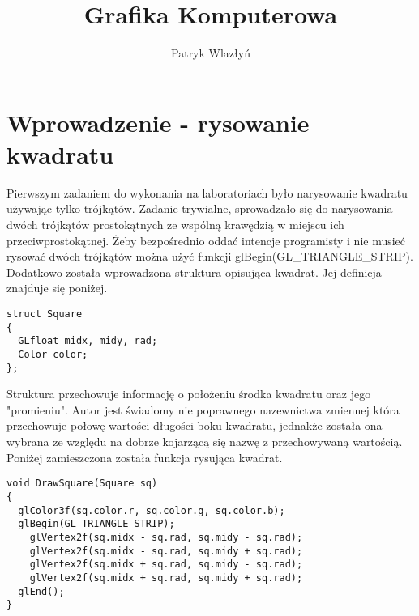 \documentclass{article}
\title{Grafika Komputerowa}
\author{Patryk Wlazłyń}
\begin{document}
\maketitle

\section{Wprowadzenie - rysowanie kwadratu}
\justify
Pierwszym zadaniem do wykonania na laboratoriach było narysowanie kwadratu używając tylko trójkątów.
Zadanie trywialne, sprowadzało się do narysowania dwóch trójkątów prostokątnych ze wspólną krawędzią w miejscu
ich przeciwprostokątnej. Żeby bezpośrednio oddać intencje programisty i nie musieć rysować dwóch trójkątów
można użyć funkcji glBegin(GL\_TRIANGLE\_STRIP). Dodatkowo została wprowadzona struktura opisująca kwadrat.
Jej definicja znajduje się poniżej.
\begin{lstlisting}
struct Square
{
  GLfloat midx, midy, rad;
  Color color;
};
\end{lstlisting}
Struktura przechowuje informację o położeniu środka kwadratu oraz jego "promieniu".
Autor jest świadomy nie poprawnego nazewnictwa zmiennej która przechowuje połowę wartości długości boku kwadratu,
jednakże została ona wybrana ze względu na dobrze kojarzącą się nazwę z przechowywaną wartością.
Poniżej zamieszczona została funkcja rysująca kwadrat.
\begin{lstlisting}
void DrawSquare(Square sq)
{
  glColor3f(sq.color.r, sq.color.g, sq.color.b);
  glBegin(GL_TRIANGLE_STRIP);
    glVertex2f(sq.midx - sq.rad, sq.midy - sq.rad);
    glVertex2f(sq.midx - sq.rad, sq.midy + sq.rad);
    glVertex2f(sq.midx + sq.rad, sq.midy - sq.rad);
    glVertex2f(sq.midx + sq.rad, sq.midy + sq.rad);
  glEnd();
}
\end{lstlisting}
\end{document}

